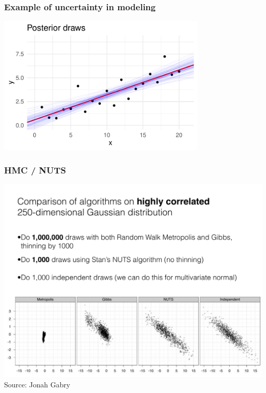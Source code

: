 \documentclass[10pt]{beamer}
\begin{document}
\begin{frame}

\frametitle{ Example of uncertainty in modeling}

  \includegraphics[width=10cm]{figs/fakel_postdraws.pdf}

\end{frame}

\begin{frame}

\frametitle{ HMC / NUTS}

  \vspace{-.5\baselineskip}
  \includegraphics[width=\textwidth,clip]{figs/N250.pdf}\\
  Source: Jonah Gabry

\end{frame}
\end{document}
